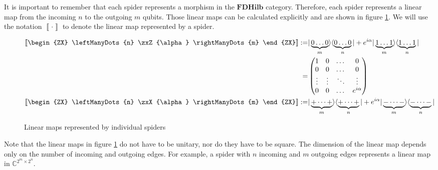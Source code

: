 It is important to remember that each spider represents a morphism in the $\mathbf{FDHilb}$ category. Therefore, each spider represents a linear map from the incoming $n$ to the outgoing $m$ qubits. Those linear maps can be calculated explicitly and are shown in figure \ref{fig:individual-spiders-linear-maps}. We will use the notation $\left \llbracket \cdot \right \rrbracket$ to denote the linear map represented by a spider.

\begin{figure}
    \begin{align*}
        \left \llbracket
        \begin{ZX}
            \leftManyDots{n}  \zxZ{\alpha} \rightManyDots{m}
        \end{ZX}
        \right \rrbracket
        := & |\underbrace{0\dots 0}_{m}\rangle \langle \underbrace{0\dots0}_{n}| + e^{i\alpha}|\underbrace{1\dots1}_{m}\rangle \langle \underbrace{1\dots1}_{n}|
        \\
        =  & \begin{pmatrix}
                 1      & 0      & \dots  & 0           \\
                 0      & 0      & \dots  & 0           \\
                 \vdots & \vdots & \ddots & \vdots      \\
                 0      & 0      & \dots  & e^{i\alpha} \\
             \end{pmatrix}
        \\
        \left \llbracket
        \begin{ZX}
            \leftManyDots{n}  \zxX{\alpha} \rightManyDots{m}
        \end{ZX}
        \right \rrbracket
        := & |\underbrace{+ \dots +}_{m}\rangle \langle \underbrace{+ \dots +}_{n}| + e^{i\alpha}|\underbrace{- \dots -}_{m}\rangle \langle \underbrace{- \dots -}_{n}|
        \\
    \end{align*}
    \caption{Linear maps represented by individual spiders}
    \label{fig:individual-spiders-linear-maps}
\end{figure}


Note that the linear maps in figure \ref{fig:individual-spiders-linear-maps} do not have to be unitary, nor do they have to be square. The dimension of the linear map depends only on the number of incoming and outgoing edges. For example, a spider with $n$ incoming and $m$ outgoing edges represents a linear map in $\mathbb{C}^{2^m \times 2^n}$.

